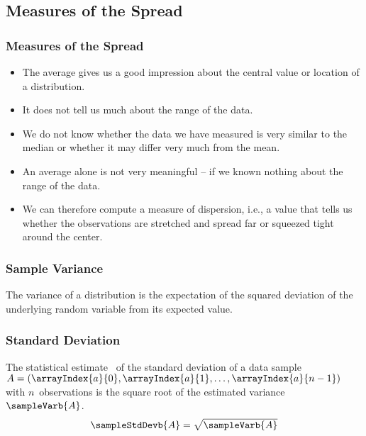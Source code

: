 \documentclass[aspectratio=169,mathserif,notheorems]{beamer}%
\begin{document}
\subsection{Measures of the Spread}%
%
\begin{frame}%
\frametitle{Measures of the Spread}%
\begin{itemize}%
\item The average gives us a good impression about the central value or location of a distribution.%
\item<2-> It does not tell us much about the range of the data.%
\item<3-> We do not know whether the data we have measured is very similar to the median or whether it may differ very much from the mean.%
\item<4-> An average alone is not very meaningful -- if we known nothing about the range of the data.%
\item<5-> We can therefore compute a measure of dispersion, i.e., a value that tells us whether the observations are stretched and spread far or squeezed tight around the center.%
\end{itemize}%
\end{frame}%
%
\begin{frame}%
\frametitle{Sample Variance}%
\begin{definition*}%
The variance of a distribution is the expectation of the squared deviation of the underlying random variable from its expected value.%
%
\end{definition*}%
\end{frame}%
%
\begin{frame}%
\frametitle{Standard Deviation}%
\begin{definition*}%
The statistical estimate~ of the standard deviation of a data sample~$A=(\arrayIndex{a}{0},\arrayIndex{a}{1}, \dots, \arrayIndex{a}{n-1})$ with $n$~observations is the square root of the estimated variance~$\sampleVarb{A}$.
\begin{equation}%
\sampleStdDevb{A} = \sqrt{\sampleVarb{A}}%
\nonumber%
\end{equation}%
\end{definition*}%
\end{frame}%
\end{document}
